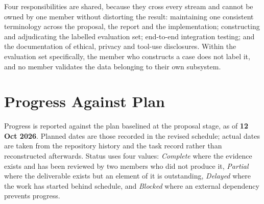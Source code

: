 Four responsibilities are shared, because they cross every stream and cannot be
owned by one member without distorting the result: maintaining one consistent
terminology across the proposal, the report and the implementation;
constructing and adjudicating the labelled evaluation set; end-to-end
integration testing; and the documentation of ethical, privacy and tool-use
disclosures. Within the evaluation set specifically, the member who constructs a
case does not label it, and no member validates the data belonging to their own
subsystem.

\section{Progress Against Plan}
\label{sec:ch3-progress}


Progress is reported against the plan baselined at the proposal stage, as of
\textbf{12 Oct 2026}. Planned dates are those recorded in the revised
schedule; actual dates are taken from the repository history and the task
record rather than reconstructed afterwards. Status uses four values:
\emph{Complete} where the evidence exists and has been reviewed by two members
who did not produce it, \emph{Partial} where the deliverable exists but an
element of it is outstanding, \emph{Delayed} where the work has started behind
schedule, and \emph{Blocked} where an external dependency prevents progress.

